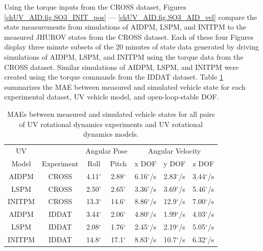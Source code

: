 Using the torque inputs from the \ac{CROSS} dataset, Figures
\ref{chUV_AID.fig.SO3_INIT_pos} --- \ref{chUV_AID.fig.SO3_AID_vel}
compare the state measurements from simulations of \ac{AIDPM},
\ac{LSPM}, and \ac{INITPM} to the measured \ac{JHUROV} states from
the \ac{CROSS} dataset.
%
%
%
Each of these four Figures display three minute subsets of the 20 minutes of
state data generated by driving simulations of \ac{AIDPM},
\ac{LSPM}, and \ac{INITPM} using the torque data from the \ac{CROSS}
dataset.
%
Similar simulations of \ac{AIDPM}, \ac{LSPM}, and \ac{INITPM} were
created using the torque commands from the \ac{IDDAT} dataset.
%
Table \ref{chUV_AID.tb.SO3_MAE} summarizes the \ac{MAE} between
measured and simulated vehicle state for each experimental dataset,
\ac{UV} vehicle model, 
and open-loop-stable \ac{DOF}.


\begin{table}[htbp]
\ssp
\caption{\acfp{MAE} between measured and simulated vehicle states for all pairs of 
  \ac{UV} rotational dynamics experiments and \ac{UV} rotational dynamics models.}
\begin{center}
\begin{tabular}{c|cccccc}
\ac{UV} & & \multicolumn{2}{c}{Angular Pose} & \multicolumn{3}{c}{Angular Velocity} \\ 
 Model & Experiment & Roll & Pitch & x \ac{DOF} & y \ac{DOF} & z \ac{DOF} \\ \hline
\ac{AIDPM}  & \ac{CROSS} & 4.11$^\circ$ & 2.88$^\circ$ & 6.16$^\circ$/s & 2.83$^\circ$/s & 3.44$^\circ$/s \\
\ac{LSPM}   & \ac{CROSS} & 2.50$^\circ$ & 2.65$^\circ$ & 3.36$^\circ$/s & 3.69$^\circ$/s & 5.46$^\circ$/s \\
\ac{INITPM} & \ac{CROSS} & 13.3$^\circ$ & 14.6$^\circ$ & 8.86$^\circ$/s & 12.9$^\circ$/s & 7.00$^\circ$/s \\
\ac{AIDPM}  & \ac{IDDAT} & 3.44$^\circ$ & 2.06$^\circ$ & 4.80$^\circ$/s & 1.99$^\circ$/s & 4.03$^\circ$/s \\
\ac{LSPM}   & \ac{IDDAT} & 2.08$^\circ$ & 1.76$^\circ$ & 2.45$^\circ$/s & 2.19$^\circ$/s & 5.05$^\circ$/s \\
\ac{INITPM} & \ac{IDDAT} & 14.8$^\circ$ & 17.1$^\circ$ & 8.83$^\circ$/s & 10.7$^\circ$/s & 6.32$^\circ$/s \\
\end{tabular}
\end{center}
\label{chUV_AID.tb.SO3_MAE}
\end{table}

